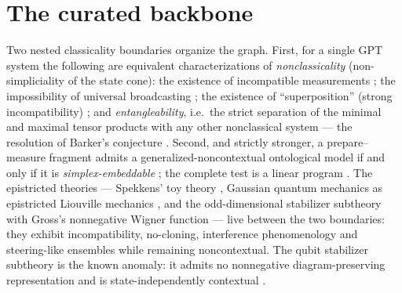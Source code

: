 \documentclass[11pt,a4paper]{article}
\theoremstyle{definition}
\begin{document}
\section{The curated backbone}\label{sec:backbone}

Two nested classicality boundaries organize the graph. First, for a single GPT
system the following are equivalent characterizations of
\emph{nonclassicality} (non-simpliciality of the state cone): the existence of
incompatible measurements \cite{plavala2016}; the impossibility of universal
broadcasting \cite{barnum2007}; the existence of ``superposition'' (strong
incompatibility) \cite{aubrun2022}; and \emph{entangleability}, i.e.\ the
strict separation of the minimal and maximal tensor products with any other
nonclassical system --- the resolution of Barker's conjecture
\cite{aubrun2021,aubrun2022}. Second, and strictly stronger, a prepare--measure
fragment admits a generalized-noncontextual ontological model
\cite{spekkens2005,spekkens2008} if and only if it is
\emph{simplex-embeddable} \cite{schmid2021}; the complete test is a linear
program \cite{selby2022lp}. The epistricted theories --- Spekkens' toy theory
\cite{spekkens2007,spekkens2016}, Gaussian quantum mechanics as epistricted
Liouville mechanics \cite{brs2012}, and the odd-dimensional stabilizer
subtheory with Gross's nonnegative Wigner function
\cite{gross2006,catani2017,schmid2022} --- live between the two boundaries:
they exhibit incompatibility, no-cloning, interference phenomenology and
steering-like ensembles while remaining noncontextual. The qubit stabilizer
subtheory is the known anomaly: it admits no nonnegative diagram-preserving
representation and is state-independently contextual
\cite{schmid2022,mermin1990,peres1991,cabello2008}.
\end{document}
